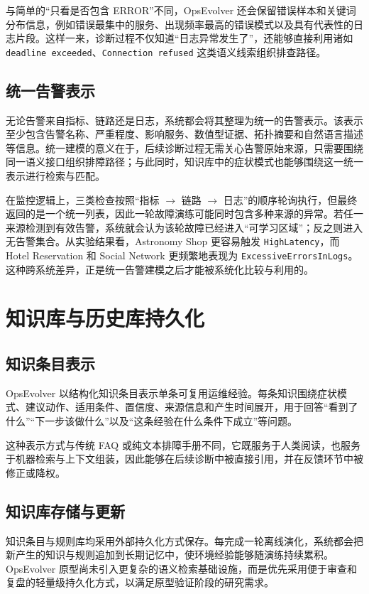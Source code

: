 与简单的“只看是否包含 ERROR”不同，OpsEvolver 还会保留错误样本和关键词分布信息，例如错误最集中的服务、出现频率最高的错误模式以及具有代表性的日志片段。这样一来，诊断过程不仅知道“日志异常发生了”，还能够直接利用诸如 \texttt{deadline exceeded}、\texttt{Connection refused} 这类语义线索组织排查路径。

\subsection{统一告警表示}

无论告警来自指标、链路还是日志，系统都会将其整理为统一的告警表示。该表示至少包含告警名称、严重程度、影响服务、数值型证据、拓扑摘要和自然语言描述等信息。统一建模的意义在于，后续诊断过程无需关心告警原始来源，只需要围绕同一语义接口组织排障路径；与此同时，知识库中的症状模式也能够围绕这一统一表示进行检索与匹配。

在监控逻辑上，三类检查按照“指标 $\rightarrow$ 链路 $\rightarrow$ 日志”的顺序轮询执行，但最终返回的是一个统一列表，因此一轮故障演练可能同时包含多种来源的异常。若任一来源检测到有效告警，系统就会认为该轮故障已经进入“可学习区域”；反之则进入无告警集合。从实验结果看，Astronomy Shop 更容易触发 \texttt{HighLatency}，而 Hotel Reservation 和 Social Network 更频繁地表现为 \texttt{ExcessiveErrorsInLogs}。这种跨系统差异，正是统一告警建模之后才能被系统化比较与利用的。

\section{知识库与历史库持久化}
\label{sec:knowledge_base_impl}

\subsection{知识条目表示}

OpsEvolver 以结构化知识条目表示单条可复用运维经验。每条知识围绕症状模式、建议动作、适用条件、置信度、来源信息和产生时间展开，用于回答“看到了什么”“下一步该做什么”以及“这条经验在什么条件下成立”等问题。

这种表示方式与传统 FAQ 或纯文本排障手册不同，它既服务于人类阅读，也服务于机器检索与上下文组装，因此能够在后续诊断中被直接引用，并在反馈环节中被修正或降权。

\subsection{知识库存储与更新}

知识条目与规则库均采用外部持久化方式保存。每完成一轮离线演化，系统都会把新产生的知识与规则追加到长期记忆中，使环境经验能够随演练持续累积。OpsEvolver 原型尚未引入更复杂的语义检索基础设施，而是优先采用便于审查和复盘的轻量级持久化方式，以满足原型验证阶段的研究需求。

